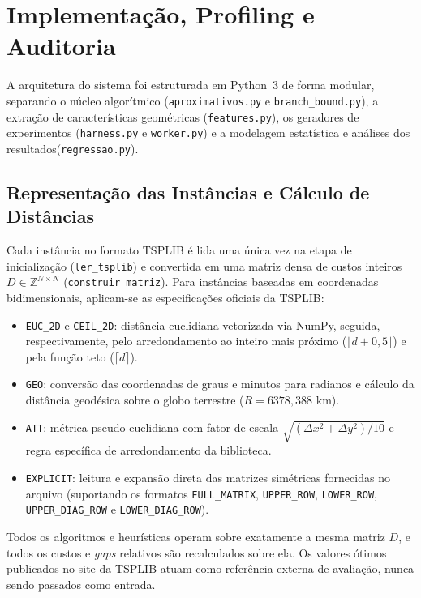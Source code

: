 \documentclass[12pt]{article}
\begin{document}
\section{Implementação, Profiling e Auditoria}

A arquitetura do sistema foi estruturada em Python~3 de forma modular, separando o núcleo algorítmico (\texttt{aproximativos.py} e \texttt{branch\_bound.py}), a extração de características geométricas (\texttt{features.py}), os geradores de experimentos (\texttt{harness.py} e \texttt{worker.py}) e a modelagem estatística e análises dos resultados(\texttt{regressao.py}).

\subsection{Representação das Instâncias e Cálculo de Distâncias}

Cada instância no formato TSPLIB é lida uma única vez na etapa de inicialização (\texttt{ler\_tsplib}) e convertida em uma matriz densa de custos inteiros $D \in \mathbb{Z}^{N \times N}$ (\texttt{construir\_matriz}). Para instâncias baseadas em coordenadas bidimensionais, aplicam-se as especificações oficiais da TSPLIB:
\begin{itemize}
    \item \texttt{EUC\_2D} e \texttt{CEIL\_2D}: distância euclidiana vetorizada via NumPy, seguida, respectivamente, pelo arredondamento ao inteiro mais próximo ($\lfloor d + 0{,}5 \rfloor$) e pela função teto ($\lceil d \rceil$).
    \item \texttt{GEO}: conversão das coordenadas de graus e minutos para radianos e cálculo da distância geodésica sobre o globo terrestre ($R = 6378{,}388\text{ km}$).
    \item \texttt{ATT}: métrica pseudo-euclidiana com fator de escala $\sqrt{(\Delta x^2 + \Delta y^2)/10}$ e regra específica de arredondamento da biblioteca.
    \item \texttt{EXPLICIT}: leitura e expansão direta das matrizes simétricas fornecidas no arquivo (suportando os formatos \texttt{FULL\_MATRIX}, \texttt{UPPER\_ROW}, \texttt{LOWER\_ROW}, \texttt{UPPER\_DIAG\_ROW} e \texttt{LOWER\_DIAG\_ROW}).
\end{itemize}

Todos os algoritmos e heurísticas operam sobre exatamente a mesma matriz $D$, e todos os custos e \textit{gaps} relativos são recalculados sobre ela. Os valores ótimos publicados no site da TSPLIB atuam como referência externa de avaliação, nunca sendo passados como entrada.
\end{document}
